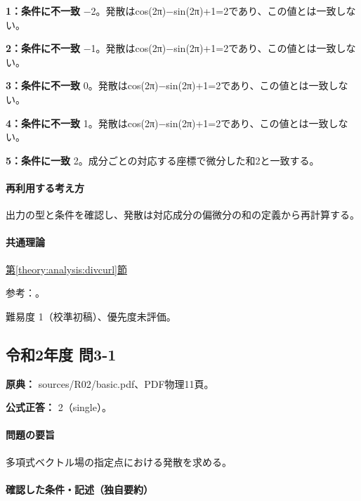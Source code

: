 \noindent\textbf{1：条件に不一致} −2。発散はcos(2π)−sin(2π)+1=\allowbreak{}2であり、この値とは一致しない。\par

\noindent\textbf{2：条件に不一致} −1。発散はcos(2π)−sin(2π)+1=\allowbreak{}2であり、この値とは一致しない。\par

\noindent\textbf{3：条件に不一致} 0。発散はcos(2π)−sin(2π)+1=\allowbreak{}2であり、この値とは一致しない。\par

\noindent\textbf{4：条件に不一致} 1。発散はcos(2π)−sin(2π)+1=\allowbreak{}2であり、この値とは一致しない。\par

\noindent\textbf{5：条件に一致} 2。成分ごとの対応する座標で微分した和2と一致する。\par

\paragraph{再利用する考え方} 出力の型と条件を確認し、発散は対応成分の偏微分の和の定義から再計算する。

\paragraph{共通理論} \hyperref[theory:analysis:divcurl]{第\ref*{theory:analysis:divcurl}節}

\par 参考：\cite{mit_vectorcalc2005}。

\par 難易度 1（校準初稿）、優先度未評価。

\subsection{令和2年度 問3-1}
\label{q:r02-reg-basic-3-1}

\noindent\textbf{原典：} sources/R02/basic.pdf、PDF物理11頁。

\textbf{公式正答：} 2（single）。

\paragraph{問題の要旨} 多項式ベクトル場の指定点における発散を求める。

\paragraph{確認した条件・記述（独自要約）}\mbox{}\par

